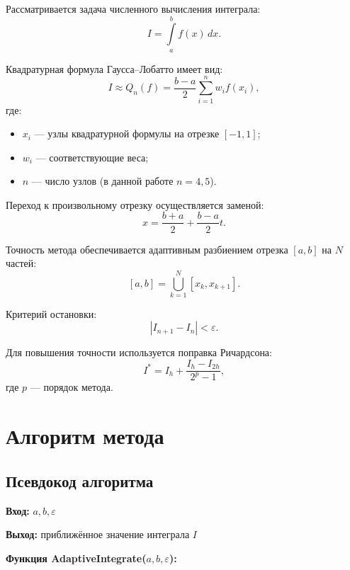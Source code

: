 \documentclass[14pt]{extarticle}
\begin{document}
	Рассматривается задача численного вычисления интеграла:
	\[
	I = \int\limits_a^b f(x)\,dx.
	\]
	
	Квадратурная формула Гаусса–Лобатто имеет вид:
	\[
	I \approx Q_n(f) = \frac{b-a}{2} \sum_{i=1}^{n} w_i f(x_i),
	\]
	где:
	\begin{itemize}
		\item $x_i$ — узлы квадратурной формулы на отрезке $[-1,1]$;
		\item $w_i$ — соответствующие веса;
		\item $n$ — число узлов (в данной работе $n=4,5$).
	\end{itemize}
	
	Переход к произвольному отрезку осуществляется заменой:
	\[
	x = \frac{b+a}{2} + \frac{b-a}{2} t.
	\]
	
	Точность метода обеспечивается адаптивным разбиением отрезка $[a,b]$ на $N$ частей:
	\[
	[a,b] = \bigcup_{k=1}^{N} [x_k, x_{k+1}].
	\]
	
	Критерий остановки:
	\[
	|I_{n+1} - I_n| < \varepsilon.
	\]
	
	Для повышения точности используется поправка Ричардсона:
	\[
	I^* = I_h + \frac{I_h - I_{2h}}{2^p - 1},
	\]
	где $p$ — порядок метода.
	
	
	\newpage
	\section{Алгоритм метода}
	
	\subsection{Псевдокод алгоритма}
	
	\textbf{Вход:} $a, b, \varepsilon$
	
	\textbf{Выход:} приближённое значение интеграла $I$
	
	\textbf{Функция AdaptiveIntegrate($a, b, \varepsilon$):}
	
\end{document}
